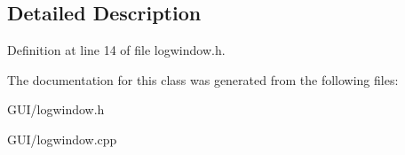 \subsection{Detailed Description}


Definition at line 14 of file logwindow.\+h.



The documentation for this class was generated from the following files\+:\begin{DoxyCompactItemize}
\item 
G\+U\+I/logwindow.\+h\item 
G\+U\+I/logwindow.\+cpp\end{DoxyCompactItemize}
